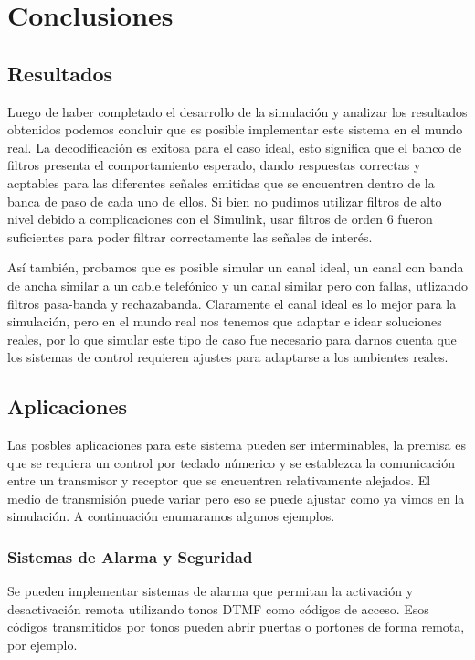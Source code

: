 \chapter{Conclusiones}
\section{Resultados}
Luego de haber completado el desarrollo de la simulación y analizar los resultados obtenidos podemos concluir que es posible implementar este sistema en el mundo real. La decodificación es exitosa para el caso ideal, esto significa que el banco de filtros presenta el comportamiento esperado, dando respuestas correctas y acptables para las diferentes señales emitidas que se encuentren dentro de la banca de paso de cada uno de ellos. Si bien no pudimos utilizar filtros de alto nivel debido a complicaciones con el Simulink, usar filtros de orden 6 fueron suficientes para poder filtrar correctamente las señales de interés.

Así también, probamos que es posible simular un canal ideal, un canal con banda de ancha similar a un cable telefónico y un canal similar pero con fallas, utlizando filtros pasa-banda y rechazabanda. Claramente el canal ideal es lo mejor para la simulación, pero en el mundo real nos tenemos que adaptar e idear soluciones reales, por lo que simular este tipo de caso fue necesario para darnos cuenta que los sistemas de control requieren ajustes para adaptarse a los ambientes reales.

\section{Aplicaciones}
Las posbles aplicaciones para este sistema pueden ser interminables, la premisa es que se requiera un control por teclado númerico y se establezca la comunicación entre un transmisor y receptor que se encuentren relativamente alejados. El medio de transmisión puede variar pero eso se puede ajustar como ya vimos en la simulación. A continuación enumaramos algunos ejemplos.

\subsection*{Sistemas de Alarma y Seguridad}
Se pueden implementar sistemas de alarma que permitan la activación y desactivación remota utilizando tonos DTMF como códigos de acceso. Esos códigos transmitidos por tonos pueden abrir puertas o portones de forma remota, por ejemplo.

